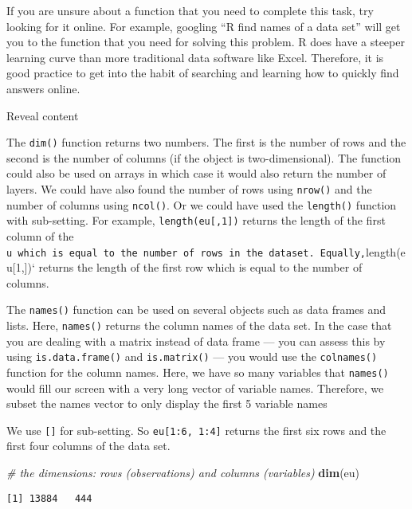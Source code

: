 \documentclass[]{article}
\newenvironment{Shaded}{\begin{snugshade}}{\end{snugshade}}
\newcommand{\CommentTok}[1]{\textcolor[rgb]{0.56,0.35,0.01}{\textit{#1}}}
\newcommand{\KeywordTok}[1]{\textcolor[rgb]{0.13,0.29,0.53}{\textbf{#1}}}
\newcommand{\NormalTok}[1]{#1}
\begin{document}
If you are unsure about a function that you need to complete this task, try looking for it online. For example, googling ``R find names of a data set'' will get you to the function that you need for solving this problem. R does have a steeper learning curve than more traditional data software like Excel. Therefore, it is good practice to get into the habit of searching and learning how to quickly find answers online.

Reveal content

The \texttt{dim()} function returns two numbers. The first is the number of rows and the second is the number of columns (if the object is two-dimensional). The function could also be used on arrays in which case it would also return the number of layers. We could have also found the number of rows using \texttt{nrow()} and the number of columns using \texttt{ncol()}. Or we could have used the \texttt{length()} function with sub-setting. For example, \texttt{length(eu{[},1{]})} returns the length of the first column of the \texttt{u\ which\ is\ equal\ to\ the\ number\ of\ rows\ in\ the\ dataset.\ Equally,}length(eu{[}1,{]})` returns the length of the first row which is equal to the number of columns.

The \texttt{names()} function can be used on several objects such as data frames and lists. Here, \texttt{names()} returns the column names of the data set. In the case that you are dealing with a matrix instead of data frame --- you can assess this by using \texttt{is.data.frame()} and \texttt{is.matrix()} --- you would use the \texttt{colnames()} function for the column names. Here, we have so many variables that \texttt{names()} would fill our screen with a very long vector of variable names. Therefore, we subset the names vector to only display the first 5 variable names

We use \texttt{{[}{]}} for sub-setting. So \texttt{eu{[}1:6,\ 1:4{]}} returns the first six rows and the first four columns of the data set.

\begin{Shaded}
\begin{Highlighting}[]
\CommentTok{# the dimensions: rows (observations) and columns (variables) }
\KeywordTok{dim}\NormalTok{(eu)}
\end{Highlighting}
\end{Shaded}

\begin{verbatim}
[1] 13884   444
\end{verbatim}
\end{document}
